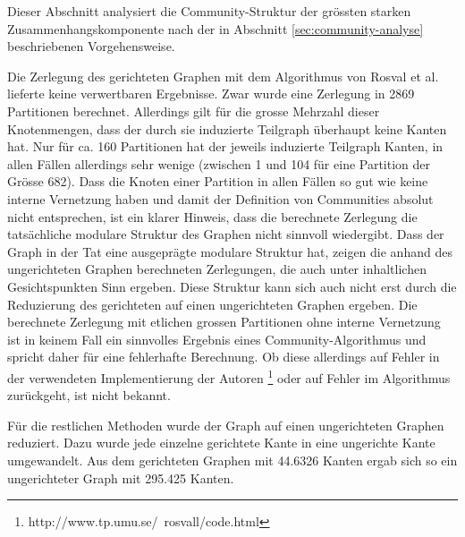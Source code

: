 Dieser Abschnitt analysiert die Community-Struktur der gr\"ossten
starken Zusammenhangskomponente nach der in Abschnitt
\ref{sec:community-analyse} beschriebenen Vorgehensweise.

Die Zerlegung des gerichteten Graphen mit dem Algorithmus von Rosval
et al. lieferte keine verwertbaren Ergebnisse. Zwar wurde eine
Zerlegung in 2869 Partitionen berechnet. Allerdings gilt f\"ur die
grosse Mehrzahl dieser Knotenmengen, dass der durch sie induzierte
Teilgraph \"uberhaupt keine Kanten hat. Nur f\"ur ca. 160 Partitionen
hat der jeweils induzierte Teilgraph Kanten, in allen F\"allen
allerdings sehr wenige (zwischen 1 und 104 f\"ur eine Partition der
Gr\"osse 682). Dass die Knoten einer Partition in allen F\"allen so
gut wie keine interne Vernetzung haben und damit der Definition von
Communities absolut nicht entsprechen, ist ein klarer Hinweis, dass
die berechnete Zerlegung die tats\"achliche modulare Struktur des
Graphen nicht sinnvoll wiedergibt. Dass der Graph in der Tat eine
ausgepr\"agte modulare Struktur hat, zeigen die anhand des
ungerichteten Graphen berechneten Zerlegungen, die auch unter
inhaltlichen Gesichtspunkten Sinn ergeben. Diese Struktur kann sich
auch nicht erst durch die Reduzierung des gerichteten auf einen
ungerichteten Graphen ergeben. Die berechnete Zerlegung mit etlichen
grossen Partitionen ohne interne Vernetzung ist in keinem Fall ein
sinnvolles Ergebnis eines Community-Algorithmus und spricht daher
f\"ur eine fehlerhafte Berechnung. Ob diese allerdings auf Fehler in
der verwendeten Implementierung der Autoren
\footnote{http://www.tp.umu.se/~rosvall/code.html} oder auf Fehler im
Algorithmus zur\"uckgeht, ist nicht bekannt.

F\"ur die restlichen Methoden wurde der Graph auf einen ungerichteten
Graphen reduziert. Dazu wurde jede einzelne gerichtete Kante in eine
ungerichte Kante umgewandelt. Aus dem gerichteten Graphen mit 44.6326
Kanten ergab sich so ein ungerichteter Graph mit 295.425 Kanten.

